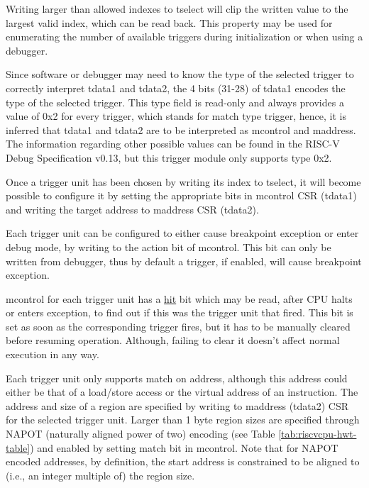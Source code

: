 \documentclass[main\_\_EN.tex]{subfiles}
\begin{document}
Writing larger than allowed indexes to tselect will clip the written value to the largest valid index, which can be read back. This property may be used for enumerating the number of available triggers during initialization or when using a debugger.

Since software or debugger may need to know the type of the selected trigger to correctly interpret tdata1 and tdata2, the 4 bits
(31-28) of tdata1 encodes the type of the selected trigger. This type field is read-only and always provides a value of 0x2 for every trigger, which stands for match type trigger, hence, it is inferred that tdata1 and tdata2 are to be interpreted as mcontrol and maddress. The information regarding other possible values can be found in the RISC-V Debug Specification v0.13, but this trigger module only supports type 0x2.

Once a trigger unit has been chosen by writing its index to tselect, it will become possible to configure it by setting the appropriate bits in mcontrol CSR (tdata1) and writing the target address to maddress CSR (tdata2).

Each trigger unit can be configured to either cause breakpoint exception or enter debug mode, by writing to the action bit of mcontrol. This bit can only be written from debugger, thus by default a trigger, if enabled, will cause breakpoint exception.

mcontrol for each trigger unit has a \hyperref[fielddesc:MCONTROLHIT]{hit} bit which may be read, after CPU halts or enters exception, to find out if this was the trigger unit that fired. This bit is set as soon as the corresponding trigger fires, but it has to be manually cleared before resuming operation. Although, failing to clear it doesn't affect normal execution in any way.

Each trigger unit only supports match on address, although this address could either be that of a load/store access or the virtual address of an instruction. The address and size of a region are specified by writing to maddress (tdata2) CSR for the selected trigger unit. Larger than 1 byte region sizes are specified through NAPOT (naturally aligned power of two) encoding (see Table \ref{tab:riscvcpu-hwt-table}) and enabled by setting match bit in mcontrol. Note that for NAPOT encoded addresses, by definition, the start address is constrained to be aligned to (i.e., an integer multiple of) the region size.
\end{document}
